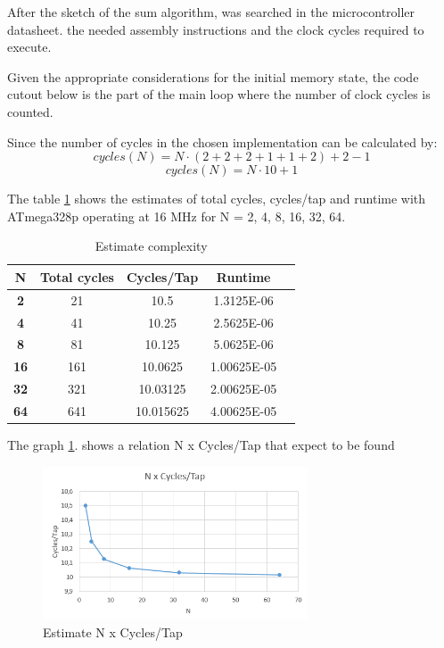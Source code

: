 \documentclass{article}
\begin{document}
After the sketch of the sum algorithm, was searched in the microcontroller datasheet\cite{AVR}. the needed assembly instructions and the clock cycles required to execute.

Given the appropriate considerations for the initial memory state, the code cutout below is the part of the main loop  where the number of clock cycles is counted.


Since the number of cycles in the chosen implementation can be calculated by:
\begin{equation}\label{eq:cyclesNumber}
cycles(N) = N\cdot(2+2+2+1+1+2) + 2 - 1
\end{equation}
\begin{equation}\label{eq:cyclesNumberS}
cycles(N) = N\cdot10 + 1
\end{equation}

The table \ref{tab:Est_N} shows the estimates of total cycles, cycles/tap and runtime with ATmega328p operating at 16 MHz for N = 2, 4, 8, 16, 32, 64. 

\begin{table}[!ht]
\begin{center}
\caption{Estimate complexity}
\begin{tabular}{|c|c|c|c|c|}
\hline
\textbf{N} & \textbf{Total cycles} & \textbf{Cycles/Tap} & \textbf{Runtime} \\
\hline
\textbf{2}  & 21  & 10.5      & 1.3125E-06  \\
\textbf{4}  & 41  & 10.25     & 2.5625E-06  \\
\textbf{8}  & 81  & 10.125    & 5.0625E-06  \\
\textbf{16} & 161 & 10.0625   & 1.00625E-05 \\
\textbf{32} & 321 & 10.03125  & 2.00625E-05 \\
\textbf{64} & 641 & 10.015625 & 4.00625E-05 \\
\hline
\end{tabular}
\label{tab:Est_N}
\end{center}
\end{table}


The graph \ref{fig:Est_NxTap}. shows a relation N x Cycles/Tap that expect to be found

\begin{figure}[!ht]
\centering
\includegraphics[width=0.7\textwidth]
{./figuras/Estimate_NxTap.png}
\caption{Estimate N x Cycles/Tap}
\label{fig:Est_NxTap}
\end{figure}
\end{document}
